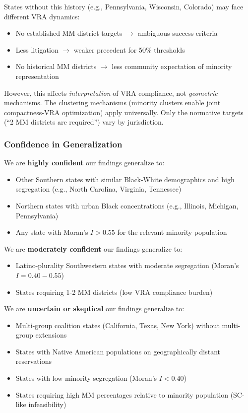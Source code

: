 States without this history (e.g., Pennsylvania, Wisconsin, Colorado) may face different VRA dynamics:
\begin{itemize}
    \item No established MM district targets $\to$ ambiguous success criteria
    \item Less litigation $\to$ weaker precedent for 50\% thresholds
    \item No historical MM districts $\to$ less community expectation of minority representation
\end{itemize}

However, this affects \emph{interpretation} of VRA compliance, not \emph{geometric} mechanisms. The clustering mechanisms (minority clusters enable joint compactness-VRA optimization) apply universally. Only the normative targets (``2 MM districts are required'') vary by jurisdiction.

\subsubsection{Confidence in Generalization}

We are \textbf{highly confident} our findings generalize to:
\begin{itemize}
    \item Other Southern states with similar Black-White demographics and high segregation (e.g., North Carolina, Virginia, Tennessee)
    \item Northern states with urban Black concentrations (e.g., Illinois, Michigan, Pennsylvania)
    \item Any state with Moran's $I > 0.55$ for the relevant minority population
\end{itemize}

We are \textbf{moderately confident} our findings generalize to:
\begin{itemize}
    \item Latino-plurality Southwestern states with moderate segregation (Moran's $I = 0.40-0.55$)
    \item States requiring 1-2 MM districts (low VRA compliance burden)
\end{itemize}

We are \textbf{uncertain or skeptical} our findings generalize to:
\begin{itemize}
    \item Multi-group coalition states (California, Texas, New York) without multi-group extensions
    \item States with Native American populations on geographically distant reservations
    \item States with low minority segregation (Moran's $I < 0.40$)
    \item States requiring high MM percentages relative to minority population (SC-like infeasibility)
\end{itemize}

